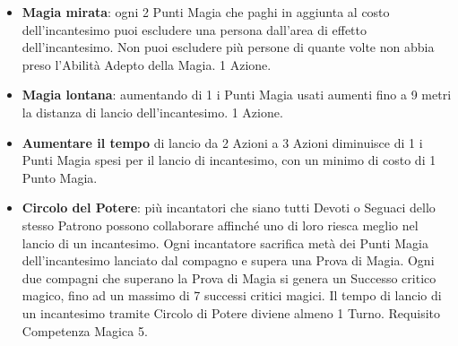 \documentclass[landscape,10pt,a4paper]{article}
\begin{document}
\begin{multicols}{2}
\begin{dmbox}[title=Alterare la Magia - pagina \pageref{magiealteraremagie}]
\begin{itemize}[leftmargin=0.5cm,itemsep=-1pt,parsep=0pt]
\item \textbf{Magia mirata}: ogni 2 Punti Magia che paghi in aggiunta al costo dell'incantesimo puoi escludere una persona dall'area di effetto dell'incantesimo. Non puoi escludere più persone di quante volte non abbia preso l'Abilità Adepto della Magia. 1 Azione. %

\item \textbf{Magia lontana}: aumentando di 1 i Punti Magia usati aumenti fino a 9 metri la distanza di lancio dell'incantesimo. 1 Azione.

\item \textbf{Aumentare il tempo} di lancio da 2 Azioni a 3 Azioni diminuisce di 1 i Punti Magia spesi per il lancio di incantesimo, con un minimo di costo di 1 Punto Magia.

\item \textbf{Circolo del Potere}: più incantatori che siano tutti Devoti o Seguaci dello stesso Patrono possono collaborare affinché uno di loro riesca meglio nel lancio di un incantesimo.
Ogni incantatore sacrifica metà dei Punti Magia dell'incantesimo lanciato dal compagno e supera una Prova di Magia. Ogni due compagni che superano la Prova di Magia si genera un Successo critico magico, fino ad un massimo di 7 successi critici magici. Il tempo di lancio di un incantesimo tramite Circolo di Potere diviene almeno 1 Turno. Requisito Competenza Magica 5.

\end{itemize}
\end{dmbox}



\end{multicols}
\end{document}

